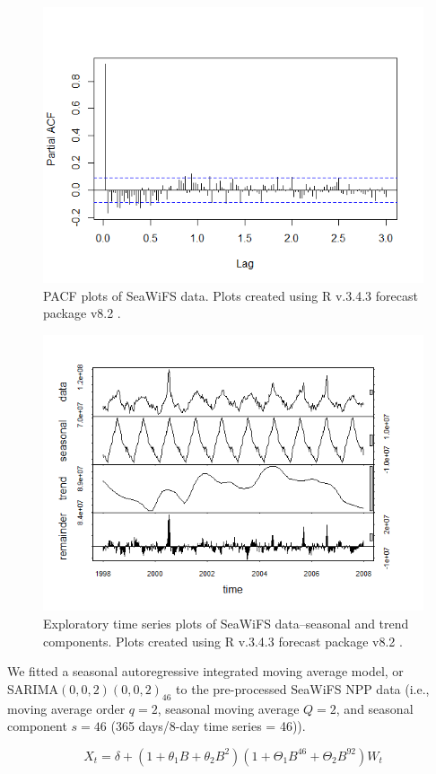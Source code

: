 \documentclass[oneside,12pt,final]{sty/ucthesis-CA2012}
\let\cite\citep                             %
\begin{document}
\begin{mainmatter}
\begin{figure}[H]
     \centering
       \includegraphics[width=.7\textwidth]{fig/seawifs_pacf}
    \caption{PACF plots of SeaWiFS data. Plots created using R v.3.4.3 \cite{Rcite} forecast package v8.2 \cite{forecast1, forecast2}.}
    \label{A3:SeaWiFSeda2}
\end{figure}

\begin{figure}[H]
     \centering
       \includegraphics[width=.7\textwidth]{fig/seawifs_periodic}
    \caption{Exploratory time series plots of SeaWiFS data--seasonal and trend components. Plots created using R v.3.4.3 \cite{Rcite} forecast package v8.2 \cite{forecast1, forecast2}.}
    \label{A3:SeaWiFSeda3}
\end{figure}

We fitted a seasonal autoregressive integrated moving average model, or \\ SARIMA$(0,0,2)(0,0,2)_{46}$ to the pre-processed SeaWiFS NPP data (i.e., moving average order $q = 2$, seasonal moving average $Q = 2$, and seasonal component $s = 46$ (365 days/8-day time series = 46)).

\begin{equation} \label{sarima_a3}
X_t = \delta + (1 + \theta_1B + \theta_2B^2)(1 + \Theta_1B^{46} + \Theta_2B^{92})W_t
\end{equation}


\end{mainmatter}
\end{document}
